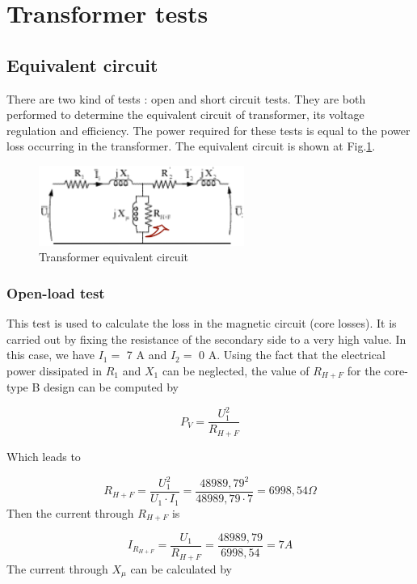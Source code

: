 \documentclass[12pt,a4paper]{report}
\begin{document}
\section{Transformer tests}

\subsection{Equivalent circuit}
There are two kind of tests : open and short circuit tests. They are both performed to determine the equivalent circuit of transformer, its voltage regulation and efficiency.
The power required for these tests is equal to the power loss occurring in the transformer. The equivalent circuit is shown at Fig.\ref{fig:equivalent_circuit}.

 \begin{figure}[h]
    \centering
    \includegraphics[width=0.6\textwidth]{equivalent_circuit.PNG}
    \caption{Transformer equivalent circuit}
    \label{fig:equivalent_circuit}
\end{figure}

\subsubsection{Open-load test}
This test is used to calculate the loss in the magnetic circuit (core losses). It is carried out by fixing the resistance of the secondary side to a very high value. In this case, we have $I_1 =$ 7 A and $I_2 =$ 0 A. Using the fact that the electrical power dissipated in $R_1$ and $X_1$ can be neglected, the value of $R_{H+F}$ for the core-type B design can be computed by

\begin{equation}
   P_V = \frac{U_1^2}{R_{H+F}}
\end{equation}

Which leads to

\begin{equation}
    R_{H+F} = \frac{U_1^2}{U_1 \cdot I_1} = \frac{48989,79^2}{48989,79 \cdot 7} = 6998,54 \Omega
\end{equation}
Then the current through $R_{H+F}$ is

\begin{equation}
    I_{R_{H+F}} = \frac{U_1}{R_{H+F}} = \frac{48989,79}{6998,54} = 7 A
\end{equation}
The current through $X_\mu$ can be calculated by 
\end{document}
